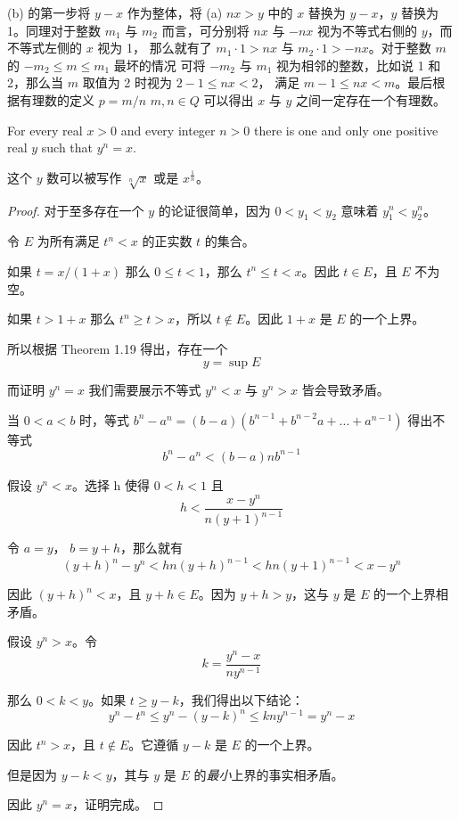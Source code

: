 \documentclass[../poma-notes.tex]{subfiles}
\begin{document}
\anote
(b) 的第一步将 $y-x$ 作为整体，将 (a) $nx > y$ 中的 $x$ 替换为 $y-x$，$y$ 替换为 1。同理对于整数
$m_1$ 与 $m_2$ 而言，可分别将 $nx$ 与 $-nx$ 视为不等式右侧的 $y$，而不等式左侧的 $x$ 视为 1，
那么就有了 $m_1 \cdot 1 > nx$ 与 $m_2 \cdot 1 > -nx$。对于整数 $m$ 的 $-m_2 \le m \le m_1$ 最坏的情况
可将 $-m_2$ 与 $m_1$ 视为相邻的整数，比如说 1 和 2，那么当 $m$ 取值为 2 时视为 $2 - 1 \le nx < 2$，
满足 $m - 1 \le nx < m$。最后根据有理数的定义 $p=m/n$ $m,n \in Q$ 可以得出 $x$ 与 $y$ 之间一定存在一个有理数。

\begin{theorem}
	For every real $x>0$ and every integer $n>0$ there is one and only one positive real $y$ such that
	$y^n=x$.
\end{theorem}

这个 $y$ 数可以被写作 $\sqrt[n]{x}$ 或是 $x^\frac{1}{n}$。

\begin{proof}
	对于至多存在一个 $y$ 的论证很简单，因为 $0 < y_1 < y_2$ 意味着 $y^n_1 < y^n_2$。

	令 $E$ 为所有满足 $t^n < x$ 的正实数 $t$ 的集合。

	如果 $t = x/(1+x)$ 那么 $0 \le t < 1$，那么 $t^n \le t < x$。因此 $t \in E$，且 $E$ 不为空。

	如果 $t>1+x$ 那么 $t^n \ge t > x$，所以 $t \notin E$。因此 $1+x$ 是 $E$ 的一个上界。

	所以根据 Theorem 1.19 得出，存在一个
	\[ y = \sup E\]

	而证明 $y^n = x$ 我们需要展示不等式 $y^n < x$ 与 $y^n > x$ 皆会导致矛盾。

	当  $0<a<b$ 时，等式 $b^n - a^n = (b-a)(b^{n-1} + b^{n-2}a + \dots + a^{n-1})$ 得出不等式
	\[b^n - a^n < (b-a)nb^{n-1}\]

	假设 $y^n<x$。选择 h 使得 $0<h<1$ 且
	\[h < \frac{x-y^n}{n(y+1)^{n-1}}\]

	令 $a=y$， $b=y+h$，那么就有
	\[(y+h)^n-y^n < hn(y+h)^{n-1} < hn(y+1)^{n-1} < x-y^n\]

	因此 $(y+h)^n < x$，且 $y+h \in E$。因为 $y+h>y$，这与 $y$ 是 $E$ 的一个上界相矛盾。

	假设 $y^n>x$。令
	\[k=\frac{y^n-x}{ny^{n-1}}\]

	那么 $0<k<y$。如果 $t \ge y-k$，我们得出以下结论：
	\[y^n - t^n \le y^n - (y - k)^n \le kny^{n-1} = y^n - x\]

	因此 $t^n > x$，且 $t \notin E$。它遵循 $y - k$ 是 $E$ 的一个上界。

	但是因为 $y-k<y$，其与 $y$ 是 $E$ 的\textit{最小}上界的事实相矛盾。

	因此 $y^n=x$，证明完成。
\end{proof}
\end{document}
